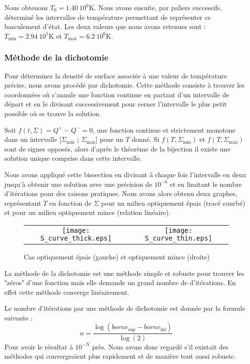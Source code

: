 Nous obtenons $T_0 =1.40\ 10^6 \mathrm{K}$. Nous avons ensuite, par paliers successifs, déterminé les intervalles de température permettant de représenter ce basculement d'état. Les deux valeurs que nous avons retenues sont : $T_\textrm{min} = 2.94\ 10^5 \mathrm{K}$ et $T_\textrm{max} = 6.2\ 10^6 \mathrm{K}$. 


\subsubsection{Méthode de la dichotomie}

Pour déterminer la densité de surface associée à une valeur de température précise, nous avons procédé par dichotomie.
Cette méthode consiste à trouver les coordonnées où s'annule une fonction continue en partant d'un intervalle de départ et en le divisant successivement pour cerner l'intervalle le plus petit possible où se trouve la solution.  

Soit $f(t, \Sigma) = Q^+ - Q^- = 0$,  une fonction continue et strictement monotone dans un intervalle [$\Sigma_\textrm{min}$ ; $\Sigma_\textrm{max}$] pour un $T$ donné. Si $f(T,\Sigma_\textrm{min} )$ et $f(T,\Sigma_\textrm{max})$ sont de signes opposés, alors d'après le théorème de la bijection il existe une solution unique comprise dans cette intervalle. 

Nous avons appliqué cette bissection en divisant à chaque fois l'intervalle en deux jusqu'à obtenir une solution avec une précision de $10^{-6}$ et en limitant le nombre d'itérations pour des raisons pratiques. Nous avons alors obtenu deux graphes, représentant $T$ en fonction de $\Sigma$ pour un milieu optiquement épais (tracé courbé) et pour un milieu optiquement mince (relation linéaire).


\begin{figure}[htb!]
\centering
\begin{tabular}{cc} 
\texttt{[image: S\_curve\_thick.eps]} &
\texttt{[image: S\_curve\_thin.eps]} \\
\end{tabular}
  \caption{Cas optiquement épais (gauche) et optiquement mince (droite)}
\label{Fig::}
\end{figure}

La méthode de la dichotomie est une méthode simple et robuste pour trouver les "zéros" d'une fonction mais elle demande un grand nombre de d'itérations. En effet cette méthode converge linéairement.

Le nombre d'itérations par une méthode de dichotomie est donnée par la formule suivante : 
\begin{equation}
n = \frac{\log(borne_\mathrm{sup} - borne_\mathrm{inf})}{\log(2)} 
\end{equation}
Pour avoir le résultat à $10^{-N}$ près.
Nous avons donc regardé s'il existait des méthodes qui convergeaient plus rapidement et de manière tout aussi robuste. 

